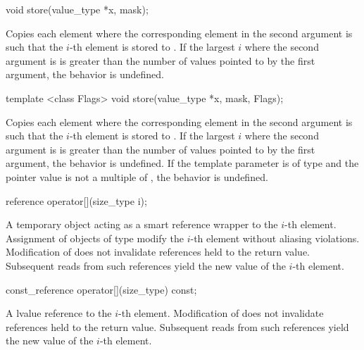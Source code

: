 \begin{itemdecl}
void store(value_type *x, mask);
\end{itemdecl}
\begin{itemdescr}
  \pnum\effects Copies each element where the corresponding element in the second argument is \true such that the $i$-th element is stored to .
  \pnum\remarks If the largest $i$ where the second argument is \true is greater than the number of values pointed to by the first argument, the behavior is undefined.
\end{itemdescr}

\begin{itemdecl}
template <class Flags> void store(value_type *x, mask, Flags);
\end{itemdecl}
\begin{itemdescr}
  \pnum\effects Copies each element where the corresponding element in the second argument is \true such that the $i$-th element is stored to .
  \pnum\remarks If the largest $i$ where the second argument is \true is greater than the number of values pointed to by the first argument, the behavior is undefined.
  \pnum\remarks If the template parameter is of type  and the pointer value is not a multiple of , the behavior is undefined.
\end{itemdescr}

\begin{itemdecl}
reference operator[](size_type i);
\end{itemdecl}
\begin{itemdescr}
  \pnum\returns A temporary object acting as a smart reference wrapper to the $i$-th element.
  \pnum\postconditions Assignment of objects of type \bool modify the $i$-th element without aliasing violations.
  \pnum                Modification of  does not invalidate references held to the return value.
  Subsequent reads from such references yield the new value of the $i$-th element.
\end{itemdescr}

\begin{itemdecl}
const_reference operator[](size_type) const;
\end{itemdecl}
\begin{itemdescr}
  \pnum\returns A \const lvalue reference to the $i$-th element.
  \pnum\postconditions Modification of  does not invalidate references held to the return value.
  Subsequent reads from such references yield the new value of the $i$-th element.
\end{itemdescr}

